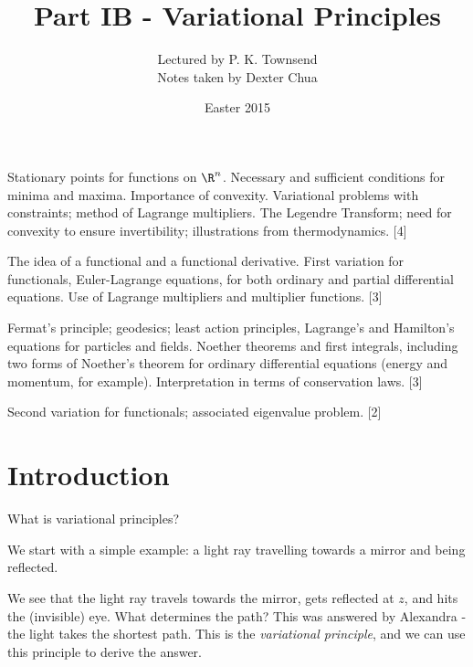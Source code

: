 \documentclass[a4paper]{article}
\title{Part IB - Variational Principles}
\author{Lectured by P. K. Townsend\\\small Notes taken by Dexter Chua}
\date{Easter 2015}
\begin{document}
\maketitle
{\small
\noindent Stationary points for functions on $\R^n$. Necessary and sufficient conditions for minima and maxima. Importance of convexity. Variational problems with constraints; method of Lagrange multipliers. The Legendre Transform; need for convexity to ensure invertibility; illustrations from thermodynamics.\hspace*{\fill} [4]

\vspace{5pt}
\noindent The idea of a functional and a functional derivative. First variation for functionals, Euler-Lagrange equations, for both ordinary and partial differential equations. Use of Lagrange multipliers and multiplier functions.\hspace*{\fill} [3]

\vspace{5pt}
\noindent Fermat's principle; geodesics; least action principles, Lagrange's and Hamilton's equations for particles and fields. Noether theorems and first integrals, including two forms of Noether's theorem for ordinary differential equations (energy and momentum, for example). Interpretation in terms of conservation laws.\hspace*{\fill} [3]

\vspace{5pt}
\noindent Second variation for functionals; associated eigenvalue problem.\hspace*{\fill} [2]}

\tableofcontents
\setcounter{section}{-1}
\section{Introduction}
What is variational principles?

We start with a simple example: a light ray travelling towards a mirror and being reflected.
\begin{center}
\end{center}
We see that the light ray travels towards the mirror, gets reflected at $z$, and hits the (invisible) eye. What determines the path? This was answered by Alexandra - the light takes the shortest path. This is the \emph{variational principle}, and we can use this principle to derive the answer.
\end{document}
